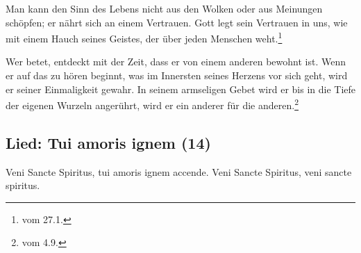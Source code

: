 \newpage
Man kann den Sinn des Lebens nicht aus den Wolken oder aus Meinungen schöpfen; er nährt sich an einem Vertrauen. Gott legt sein Vertrauen in uns, wie mit einem Hauch seines Geistes, der über jeden Menschen weht.\footnote{\cite{FR-heute} vom 27.1.}
\par
Wer betet, entdeckt mit der Zeit, dass er von einem anderen bewohnt ist. Wenn er auf das zu hören beginnt, was im Innersten seines Herzens vor sich geht, wird er seiner Einmaligkeit gewahr. In seinem armseligen Gebet wird er bis in die Tiefe der eigenen Wurzeln angerührt, wird er ein anderer für die anderen.\footnote{\cite{FR-heute} vom 4.9.}

\newpage

\subsection{Lied: Tui amoris ignem (14)}
Veni Sancte Spiritus, tui amoris ignem accende. Veni Sancte Spiritus, veni sancte spiritus.